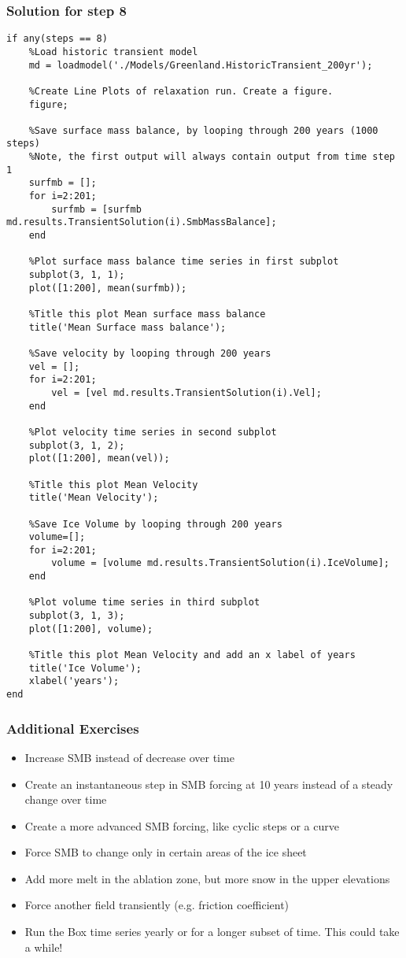 \subsubsection{Solution for step 8} %
\begin{lstlisting}
if any(steps == 8)
	%Load historic transient model
	md = loadmodel('./Models/Greenland.HistoricTransient_200yr');

	%Create Line Plots of relaxation run. Create a figure.
	figure;

	%Save surface mass balance, by looping through 200 years (1000 steps)
	%Note, the first output will always contain output from time step 1
	surfmb = [];
	for i=2:201;
		surfmb = [surfmb md.results.TransientSolution(i).SmbMassBalance];
	end

	%Plot surface mass balance time series in first subplot
	subplot(3, 1, 1);
	plot([1:200], mean(surfmb));

	%Title this plot Mean surface mass balance
	title('Mean Surface mass balance');

	%Save velocity by looping through 200 years
	vel = [];
	for i=2:201;
		vel = [vel md.results.TransientSolution(i).Vel];
	end

	%Plot velocity time series in second subplot
	subplot(3, 1, 2);
	plot([1:200], mean(vel));

	%Title this plot Mean Velocity
	title('Mean Velocity');

	%Save Ice Volume by looping through 200 years
	volume=[];
	for i=2:201;
		volume = [volume md.results.TransientSolution(i).IceVolume];
	end

	%Plot volume time series in third subplot
	subplot(3, 1, 3);
	plot([1:200], volume);

	%Title this plot Mean Velocity and add an x label of years
	title('Ice Volume');
	xlabel('years');
end
\end{lstlisting}

\subsubsection{Additional Exercises} %
\begin{itemize}
	\item Increase SMB instead of decrease over time
	\item Create an instantaneous step in SMB forcing at 10 years instead of a steady change over time
	\item Create a more advanced SMB forcing, like cyclic steps or a curve
	\item Force SMB to change only in certain areas of the ice sheet
	\item Add more melt in the ablation zone, but more snow in the upper elevations
	\item Force another field transiently (e.g. friction coefficient)
	\item Run the Box time series yearly or for a longer subset of time. This could take a while!
\end{itemize}


